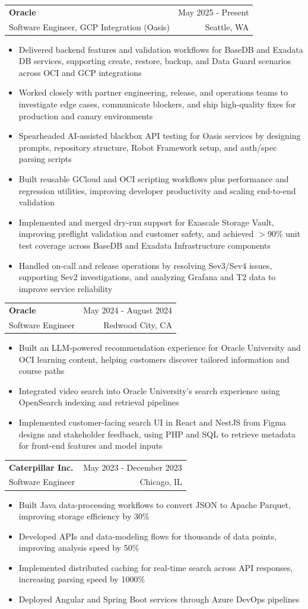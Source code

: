 \documentclass[letterpaper,11pt]{article}
\makeatletter
\newcommand{\resumeItem}[1]{
  \item\small{
    {#1 \vspace{-2pt}}
  }
}
\newcommand{\resumeSubheading}[4]{
  \vspace{-2pt}\item
    \begin{tabular*}{0.97\textwidth}[t]{l@{\extracolsep{\fill}}r}
      \textbf{#1} & #2 \\
      {\small#3} & {\small #4} \\
    \end{tabular*}\vspace{-7pt}
}
\newcommand{\resumeItemListStart}{\begin{itemize}}
\newcommand{\resumeItemListEnd}{\end{itemize}\vspace{-5pt}}
\makeatother
\begin{document}
    \resumeSubheading
  {Oracle}{May 2025 - Present}
  {Software Engineer, GCP Integration (Oasis)}{Seattle, WA}
  \resumeItemListStart
    \resumeItem{Delivered backend features and validation workflows for BaseDB and Exadata DB services, supporting create, restore, backup, and Data Guard scenarios across OCI and GCP integrations}
    \resumeItem{Worked closely with partner engineering, release, and operations teams to investigate edge cases, communicate blockers, and ship high-quality fixes for production and canary environments}
    \resumeItem{Spearheaded AI-assisted blackbox API testing for Oasis services by designing prompts, repository structure, Robot Framework setup, and auth/spec parsing scripts}
    \resumeItem{Built reusable GCloud and OCI scripting workflows plus performance and regression utilities, improving developer productivity and scaling end-to-end validation}
    \resumeItem{Implemented and merged dry-run support for Exascale Storage Vault, improving preflight validation and customer safety, and achieved $>$90\% unit test coverage across BaseDB and Exadata Infrastructure components}
    \resumeItem{Handled on-call and release operations by resolving Sev3/Sev4 issues, supporting Sev2 investigations, and analyzing Grafana and T2 data to improve service reliability}
  \resumeItemListEnd

    \resumeSubheading
      {Oracle}{May 2024 - August 2024}
      {Software Engineer}{Redwood City, CA}
      \resumeItemListStart
        \resumeItem{Built an LLM-powered recommendation experience for Oracle University and OCI learning content, helping customers discover tailored information and course paths}
        \resumeItem{Integrated video search into Oracle University's search experience using OpenSearch indexing and retrieval pipelines}
        \resumeItem{Implemented customer-facing search UI in React and NestJS from Figma designs and stakeholder feedback, using PHP and SQL to retrieve metadata for front-end features and model inputs}
      \resumeItemListEnd

    \resumeSubheading
      {Caterpillar Inc.}{May 2023 - December 2023}
      {Software Engineer}{Chicago, IL}
      \resumeItemListStart
        \resumeItem{Built Java data-processing workflows to convert JSON to Apache Parquet, improving storage efficiency by 30\%}
        \resumeItem{Developed APIs and data-modeling flows for thousands of data points, improving analysis speed by 50\%}
        \resumeItem{Implemented distributed caching for real-time search across API responses, increasing parsing speed by 1000\%}
        \resumeItem{Deployed Angular and Spring Boot services through Azure DevOps pipelines}
      \resumeItemListEnd
\end{document}
